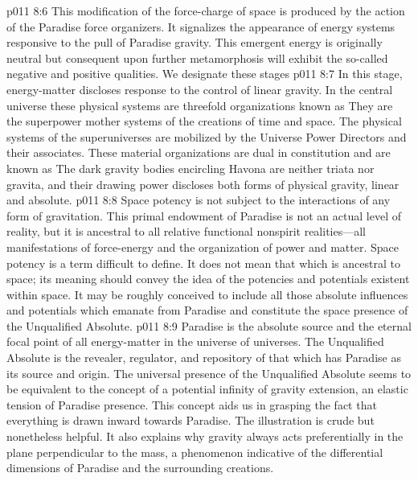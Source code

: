 \pc \vs p011 8:6 \bibnobreakspace {} This modification of the force\hyp{}charge of space is produced by the action of the Paradise force organizers. It signalizes the appearance of energy systems responsive to the pull of Paradise gravity. This emergent energy is originally neutral but consequent upon further metamorphosis will exhibit the so\hyp{}called negative and positive qualities. We designate these stages 
\pc \vs p011 8:7 \bibnobreakspace {} In this stage, energy\hyp{}matter discloses response to the control of linear gravity. In the central universe these physical systems are threefold organizations known as  They are the superpower mother systems of the creations of time and space. The physical systems of the superuniverses are mobilized by the Universe Power Directors and their associates. These material organizations are dual in constitution and are known as  The dark gravity bodies encircling Havona are neither triata nor gravita, and their drawing power discloses both forms of physical gravity, linear and absolute.
\pc \vs p011 8:8 Space potency is not subject to the interactions of any form of gravitation. This primal endowment of Paradise is not an actual level of reality, but it is ancestral to all relative functional nonspirit realities---all manifestations of force\hyp{}energy and the organization of power and matter. Space potency is a term difficult to define. It does not mean that which is ancestral to space; its meaning should convey the idea of the potencies and potentials existent within space. It may be roughly conceived to include all those absolute influences and potentials which emanate from Paradise and constitute the space presence of the Unqualified Absolute.
\vs p011 8:9 Paradise is the absolute source and the eternal focal point of all energy\hyp{}matter in the universe of universes. The Unqualified Absolute is the revealer, regulator, and repository of that which has Paradise as its source and origin. The universal presence of the Unqualified Absolute seems to be equivalent to the concept of a potential infinity of gravity extension, an elastic tension of Paradise presence. This concept aids us in grasping the fact that everything is drawn inward towards Paradise. The illustration is crude but nonetheless helpful. It also explains why gravity always acts preferentially in the plane perpendicular to the mass, a phenomenon indicative of the differential dimensions of Paradise and the surrounding creations.\plusone
